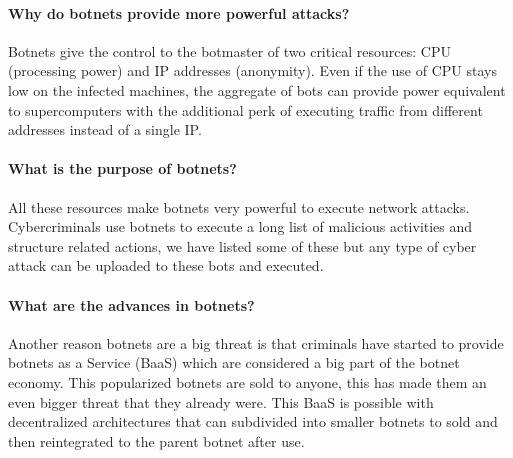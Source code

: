 \paragraph{Why do botnets provide more powerful attacks?} Botnets give the control to the botmaster of two critical resources: CPU (processing power) and IP addresses (anonymity). Even if the use of CPU stays low on the infected machines, the aggregate of bots can provide power equivalent to supercomputers with the additional perk of executing traffic from different addresses instead of a single IP\cite{survey4}.

\paragraph{What is the purpose of botnets?} All these resources make botnets very powerful to execute network attacks\cite{bot-intro}. Cybercriminals use botnets to execute a long list of malicious activities and structure related actions, we have listed some of these but any type of cyber attack can be uploaded to these bots and executed\cite{honeynet2}.


\paragraph{What are the advances in botnets?} Another reason botnets are a big threat is that criminals have started to provide botnets as a Service (BaaS) which are considered a big part of the botnet economy. This popularized botnets are sold to anyone, this has made them an even bigger threat that they already were\cite{survey5}.
This BaaS is possible with decentralized architectures that can subdivided into smaller botnets to sold and then reintegrated to the parent botnet after use\cite{tracking}.


\cite{memoire1}
